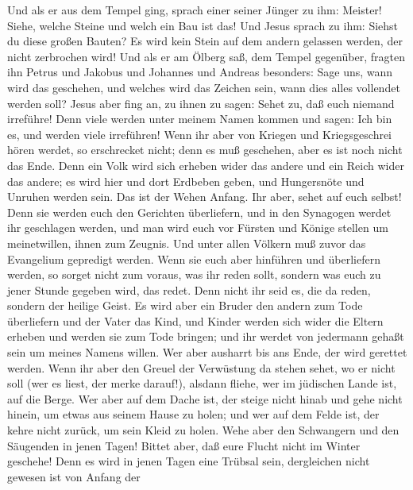  Und als er aus dem Tempel ging, sprach einer seiner
Jünger zu ihm: Meister! Siehe, welche Steine und welch ein Bau ist das!
 Und Jesus sprach zu ihm: Siehst du diese großen Bauten?
Es wird kein Stein auf dem andern gelassen werden, der nicht zerbrochen
wird!  Und als er am Ölberg saß, dem Tempel gegenüber,
fragten ihn Petrus und Jakobus und Johannes und Andreas besonders:
 Sage uns, wann wird das geschehen, und welches wird das
Zeichen sein, wann dies alles vollendet werden soll? 
Jesus aber fing an, zu ihnen zu sagen: Sehet zu, daß euch niemand
irreführe!  Denn viele werden unter meinem Namen kommen
und sagen: Ich bin es, und werden viele irreführen!  Wenn
ihr aber von Kriegen und Kriegsgeschrei hören werdet, so erschrecket
nicht; denn es muß geschehen, aber es ist noch nicht das Ende.
 Denn ein Volk wird sich erheben wider das andere und ein
Reich wider das andere; es wird hier und dort Erdbeben geben, und
Hungersnöte und Unruhen werden sein. Das ist der Wehen Anfang.
 Ihr aber, sehet auf euch selbst! Denn sie werden euch den
Gerichten überliefern, und in den Synagogen werdet ihr geschlagen
werden, und man wird euch vor Fürsten und Könige stellen um
meinetwillen, ihnen zum Zeugnis.  Und unter allen Völkern
muß zuvor das Evangelium gepredigt werden.  Wenn sie euch
aber hinführen und überliefern werden, so sorget nicht zum voraus, was
ihr reden sollt, sondern was euch zu jener Stunde gegeben wird, das
redet. Denn nicht ihr seid es, die da reden, sondern der heilige Geist.
 Es wird aber ein Bruder den andern zum Tode überliefern
und der Vater das Kind, und Kinder werden sich wider die Eltern erheben
und werden sie zum Tode bringen;  und ihr werdet von
jedermann gehaßt sein um meines Namens willen. Wer aber ausharrt bis ans
Ende, der wird gerettet werden.  Wenn ihr aber den Greuel
der Verwüstung da stehen sehet, wo er nicht soll (wer es liest, der
merke darauf!), alsdann fliehe, wer im jüdischen Lande ist, auf die
Berge.  Wer aber auf dem Dache ist, der steige nicht
hinab und gehe nicht hinein, um etwas aus seinem Hause zu holen;
 und wer auf dem Felde ist, der kehre nicht zurück, um
sein Kleid zu holen.  Wehe aber den Schwangern und den
Säugenden in jenen Tagen!  Bittet aber, daß eure Flucht
nicht im Winter geschehe!  Denn es wird in jenen Tagen
eine Trübsal sein, dergleichen nicht gewesen ist von Anfang der
